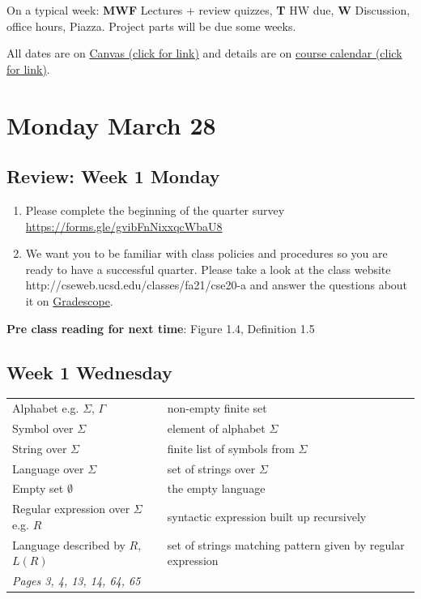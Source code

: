On a typical week: {\bf MWF} Lectures + review quizzes, {\bf T} HW due, {\bf W} Discussion, office hours, Piazza. 
Project parts will be due some weeks.

All dates are on \href{https://canvas.ucsd.edu/}{Canvas (click for link)} and details are on
 \href{https://theory-cs.github.io/website/overview_calendar.html}{course calendar (click for link)}.


\newpage
\section*{Monday March 28}


    
\newpage
\subsection*{Review: Week 1 Monday}
\begin{enumerate}
\item Please complete the beginning of the quarter survey \href{https://forms.gle/gvibFnNixxqcWbaU8}{https://forms.gle/gvibFnNixxqcWbaU8}
\item We want you to be familiar with class policies and procedures so you are ready to have a successful quarter. 
Please take a look at the class website http://cseweb.ucsd.edu/classes/fa21/cse20-a
and answer the questions about it on \href{http://gradescope.com}{Gradescope}.
\end{enumerate}

{\bf Pre class reading for next time}: Figure 1.4, Definition 1.5

\newpage
\subsection*{Week 1 Wednesday}

\begin{center}
    \begin{tabular}{|ll|}
    \hline
    Alphabet e.g. $\Sigma$, $\Gamma$ & 	non-empty finite set	 \\
    Symbol over $\Sigma$  & element of alphabet $\Sigma$\\
    String over $\Sigma$  &	finite list of symbols from $\Sigma$\\
    Language over $\Sigma$& set of strings over $\Sigma$ \\
    Empty set $\emptyset$ & the empty language\\
    Regular expression over $\Sigma$ e.g. $R$& syntactic expression built up recursively \\
    Language described by $R$,  $L(R)$ & set of strings matching pattern given by 
    regular expression\\
    \hline
    {\it Pages 3, 4, 13, 14, 64, 65}& \\
    \hline
    \end{tabular}
    \end{center}
    
